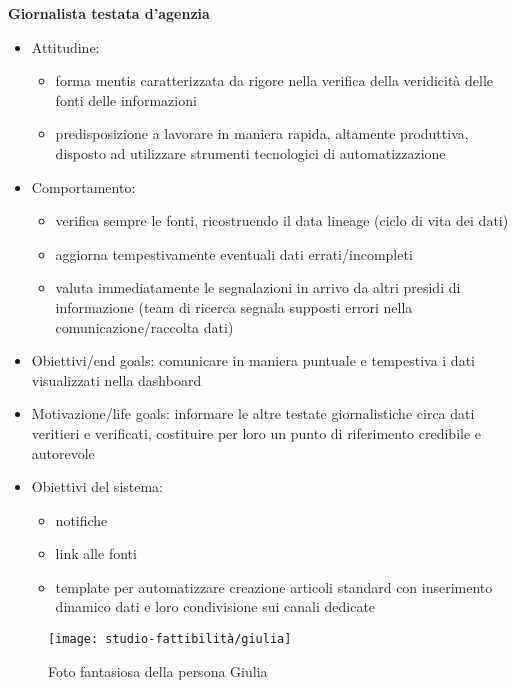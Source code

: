 \textbf{Giornalista testata d'agenzia}
\begin{itemize}
	\item Attitudine:
    \begin{itemize}
        \item forma mentis caratterizzata da rigore nella verifica della veridicità delle fonti delle informazioni
        \item predisposizione a lavorare in maniera rapida, altamente produttiva, disposto ad utilizzare strumenti tecnologici di automatizzazione
    \end{itemize}
    \item Comportamento: 
    \begin{itemize}
        \item verifica sempre le fonti, ricostruendo il data lineage (ciclo di vita dei dati)
        \item aggiorna tempestivamente eventuali dati errati/incompleti
        \item valuta immediatamente le segnalazioni in arrivo da altri presidi di informazione (team di ricerca segnala supposti errori nella comunicazione/raccolta dati)
    \end{itemize}
    \item Obiettivi/end goals: comunicare in maniera puntuale e tempestiva i dati visualizzati nella dashboard
    \item Motivazione/life goals: informare le altre testate giornalistiche circa dati veritieri e verificati, costituire per loro un punto di riferimento credibile e autorevole
    \item Obiettivi del sistema:
    \begin{itemize}
        \item notifiche
        \item link alle fonti
        \item template per automatizzare creazione articoli standard con inserimento dinamico dati e loro condivisione sui canali dedicate
    \end{itemize}
\end{itemize}

\begin{wrapfigure}{r}{7cm}
    \texttt{[image: studio-fattibilità/giulia]}
    \caption{Foto fantasiosa della persona Giulia}
\end{wrapfigure}

